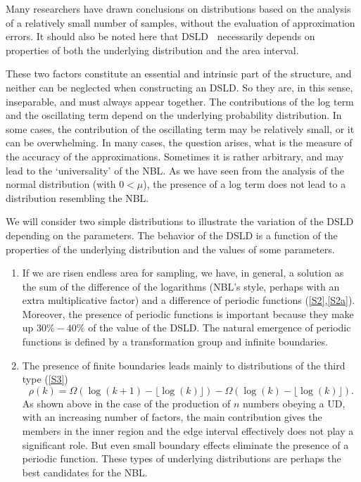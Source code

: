 \documentclass[titlepage,fleqn]{article}%
\begin{document}
Many researchers have drawn conclusions on distributions based on the analysis
of a relatively small number of samples, without the evaluation of
approximation errors. It should also be noted here that DSLD\textbf{\ }%
necessarily depends on properties of both the underlying distribution and the
area interval.

These two factors constitute an essential and intrinsic part of the structure,
and neither can be neglected when constructing an DSLD. So they are, in this
sense, inseparable, and must always appear together. The contributions of the
log term and the oscillating term depend on the underlying probability
distribution. In some cases, the contribution of the oscillating term may be
relatively small, or it can be overwhelming. In many cases, the question
arises, what is the measure of the accuracy of the approximations. Sometimes
it is rather arbitrary, and may lead to the `universality' of the NBL. As we
have seen from the analysis of the normal distribution (with $0<\mu$), the
presence of a log term does not lead to a distribution resembling the NBL.

We will consider two simple distributions to illustrate the variation of the
DSLD depending on the parameters. The behavior of the DSLD is a function of
the properties of the underlying distribution and the values of some parameters.

\begin{enumerate}
\item If we are risen endless area for sampling, we have, in general, a
solution as the sum of the difference of the logarithms (NBL's style, perhaps
with an extra multiplicative factor) and a difference of periodic functions
(\ref{S2},\ref{S2a}). Moreover, the presence of periodic functions is
important because they make up $30\%-40\%$ of the value of the DSLD. The
natural emergence of periodic functions is defined by a transformation group
and infinite boundaries.

\item The presence of finite boundaries leads mainly to distributions of the
third type (\ref{S3})%
\begin{equation}
\rho(k)=\Omega(\log(k+1)-\lfloor\log(k)\rfloor)-\Omega(\log(k)-\lfloor
\log(k)\rfloor).
\end{equation}
As shown above in the case of the production of $n$ numbers obeying a UD, with
an increasing number of factors, the main contribution gives the members in
the inner region and the edge interval effectively does not play a significant
role. But even small boundary effects eliminate the presence of a periodic
function. These types of underlying distributions are perhaps the best
candidates for the NBL.
\end{enumerate}
\end{document}
